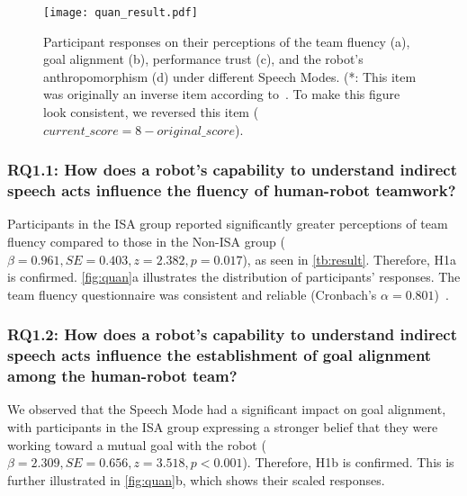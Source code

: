 \begin{figure*}[]
    \centering
    \texttt{[image: quan\_result.pdf]}
    \caption{Participant responses on their perceptions of the team fluency (a), goal alignment (b), performance trust (c), and the robot's anthropomorphism (d) under different Speech Modes. 
    (*: This item was originally an inverse item according to~\cite{hoffman2010effects}. To make this figure look consistent, we reversed this item ($current\_score = 8-original\_score$).}
    \label{fig:quan}
\end{figure*}

\subsubsection{RQ1.1: How does a robot's capability to understand indirect speech acts influence the fluency of human-robot teamwork?}

Participants in the ISA group reported significantly greater perceptions of team fluency compared to those in the Non-ISA group ($\beta = 0.961, SE = 0.403, z = 2.382, p =0.017$), as seen in \autoref{tb:result}. Therefore, H1a is confirmed. \autoref{fig:quan}a illustrates the distribution of participants' responses.
The team fluency questionnaire was consistent and reliable (Cronbach's $\alpha = 0.801$)~\cite{hoffman2019evaluating}. 

\subsubsection{RQ1.2: How does a robot's capability to understand indirect speech acts influence the establishment of goal alignment among the human-robot team?}

We observed that the Speech Mode had a significant impact on goal alignment, with participants in the ISA group expressing a stronger belief that they were working toward a mutual goal with the robot ($\beta = 2.309, SE = 0.656, z = 3.518, p < 0.001$). Therefore, H1b is confirmed. This is further illustrated in \autoref{fig:quan}b, which shows their scaled responses.

